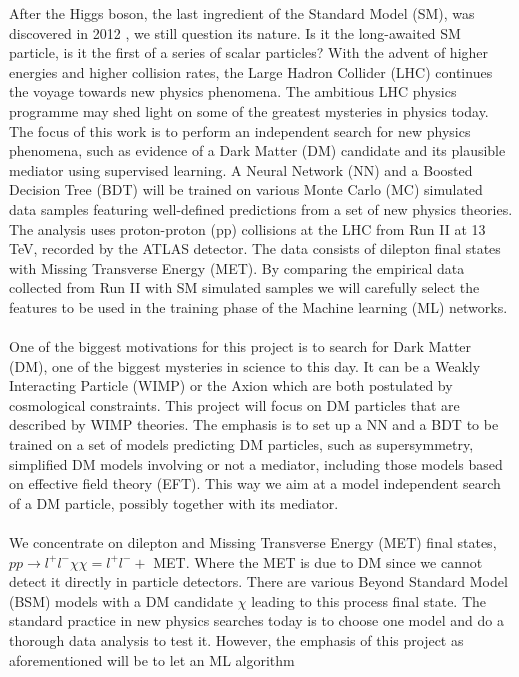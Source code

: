 \documentclass[12pt, a4paper]{book}
\begin{document}
After the Higgs boson, the last ingredient of the Standard Model (SM), was discovered in 2012 \cite{Higgs_discovery_2012}, we still question its nature. Is it the long-awaited SM particle, is it the first of a series of scalar particles? 
With the advent of higher energies and higher collision rates, the Large Hadron Collider (LHC) continues the voyage towards new physics phenomena. The ambitious LHC physics programme may shed light on some of the greatest mysteries in physics today. 
The focus of this work is to perform an independent search for new physics phenomena, such as evidence of a Dark Matter (DM) candidate and its plausible mediator using supervised learning. A Neural Network (NN) and a Boosted Decision Tree (BDT) will 
be trained on various Monte Carlo (MC) simulated data samples featuring well-defined predictions from a set of new physics theories. The analysis uses proton-proton (pp) collisions at the LHC from Run II at 13 TeV, recorded by the ATLAS detector. 
The data consists of dilepton final states with Missing Transverse Energy (MET). By comparing the empirical data collected from Run II with SM simulated samples we will carefully select the features to be used in the training phase of the Machine learning 
(ML) networks. \\
\\ One of the biggest motivations for this project is to search for Dark Matter (DM), one of the biggest mysteries in science to this day. It can be a Weakly Interacting Particle (WIMP) \cite{WIMP} or the Axion \cite{Axion} which are both postulated by cosmological constraints. 
This project will focus on DM particles that are described by WIMP theories. The emphasis is to set up a NN and a BDT to be trained on a set of models predicting DM particles, such as supersymmetry, simplified DM models involving or not a mediator, including those 
models based on effective field theory (EFT). This way we aim at a model independent search of a DM particle, possibly together with its mediator.\\
\\ We concentrate on dilepton and Missing Transverse Energy (MET) final states, $pp\rightarrow l^+l^- \chi\chi = l^+l^-+$ MET. Where the MET is due to DM since we cannot detect it directly in particle detectors. There are various Beyond Standard Model (BSM) models 
with a DM candidate $\chi$ leading to this process final state. The standard practice in new physics searches today is to choose one model and do a thorough data analysis to test it. However, the emphasis of this project as aforementioned will be to let an ML algorithm 
\end{document}
